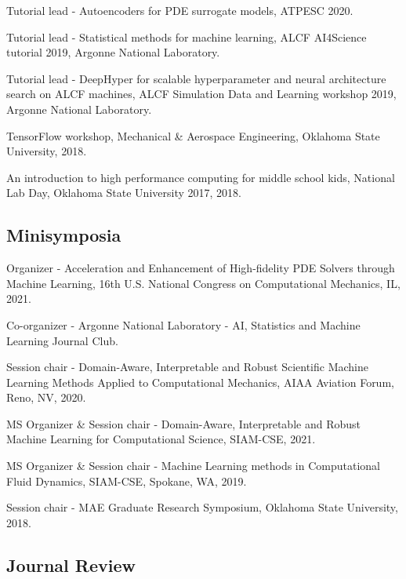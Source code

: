 \documentclass[letterpaper]{article}
\renewenvironment{itemize}{
  \begin{list}{}{
    \setlength{\leftmargin}{1.5em}
  }
}{
  \end{list}
}
\begin{document}
\begin{itemize}
  \item Tutorial lead - Autoencoders for PDE surrogate models, ATPESC 2020.
  \item Tutorial lead - Statistical methods for machine learning, ALCF AI4Science tutorial 2019, Argonne National Laboratory.
  \item Tutorial lead - DeepHyper for scalable hyperparameter and neural architecture search on ALCF machines, ALCF Simulation Data and Learning workshop 2019, Argonne National Laboratory.
  \item TensorFlow workshop, Mechanical \& Aerospace Engineering, Oklahoma State University, 2018.
  \item An introduction to high performance computing for middle school kids, National Lab Day, Oklahoma State University 2017, 2018.
\end{itemize}

\subsection*{Minisymposia}

\begin{itemize}
  \item Organizer - Acceleration and Enhancement of High-fidelity PDE Solvers through Machine Learning, 16th U.S. National Congress on Computational Mechanics, IL, 2021.
  \item Co-organizer - Argonne National Laboratory - AI, Statistics and Machine Learning Journal Club.
  \item Session chair - Domain-Aware, Interpretable and Robust Scientific Machine Learning Methods Applied to Computational Mechanics, AIAA Aviation Forum, Reno, NV, 2020.
  \item MS Organizer \& Session chair - Domain-Aware, Interpretable and Robust Machine Learning for Computational Science, SIAM-CSE, 2021.
  \item MS Organizer \& Session chair - Machine Learning methods in Computational Fluid Dynamics, SIAM-CSE, Spokane, WA, 2019.
  \item Session chair - MAE Graduate Research Symposium, Oklahoma State University, 2018.
\end{itemize}

\subsection*{Journal Review}
\end{document}
